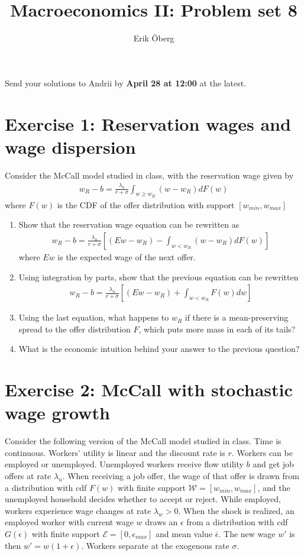 \documentclass[11pt]{article}
\title{Macroeconomics II: Problem set 8}
\author{Erik \"{O}berg}
\date{}
\newcommand{\ben}{\begin{enumerate}}
\newcommand{\een}{\end{enumerate}}
\begin{document}
\maketitle

Send your solutions to Andrii by \textbf{April 28 at 12:00} at the latest.


\section*{Exercise 1: Reservation wages and wage dispersion}
Consider the McCall model studied in class, with the reservation wage given by
\begin{eqnarray}
w_R  -b = \frac{\lambda_u }{r+\sigma} \int_{w\geq w_R} (w-w_R) dF(w) \nonumber
\end{eqnarray} 
where $F(w)$ is the CDF of the offer distribution with support $[w_{min}, w_{max}]$

\ben
\item Show that the reservation wage equation can be rewritten as
\begin{eqnarray}
w_R  -b = \frac{\lambda_u }{r+\sigma} \left[(Ew-w_R) - \int_{w <w_R} (w-w_R) dF(w) \right]\nonumber
\end{eqnarray} 
where $Ew$ is the expected wage of the next offer.

\item Using integration by parts, show that the previous equation can be rewritten
\begin{eqnarray}
w_R  -b = \frac{\lambda_u }{r+\sigma} \left[(Ew-w_R) + \int_{w <w_R} F(w)dw \right]\nonumber
\end{eqnarray} 	

\item Using the last equation, what happens to $w_R$ if there is a mean-preserving spread to the offer distribution $F$, which puts more mass in each of its tails?

\item What is the economic intuition behind your answer to the previous question? 
\een


\section*{Exercise 2: McCall with stochastic wage growth}
Consider the following version of the McCall model studied in class. Time is continuous. Workers' utility is linear and the discount rate is $r$. Workers can be employed or unemployed. Unemployed workers receive flow utility $b$ and get job offers at rate $\lambda_u$. When receiving a job offer, the wage of that offer is drawn from a distribution with cdf $F(w)$ with finite support $\mathcal{W} = [w_{min}, w_{max}]$, and the unemployed household decides whether to accept or reject. While employed, workers experience wage changes at rate $\lambda_w>0$. When the shock is realized, an employed worker with current wage $w$ draws an $\epsilon$ from a distribution with cdf $G(\epsilon)$ with finite support $\mathcal{E} = [0, \epsilon_{max}]$ and mean value $\bar \epsilon$. The new wage $w'$ is then $w'=w(1+\epsilon)$. Workers separate at the exogenous rate $\sigma$.
\end{document}
